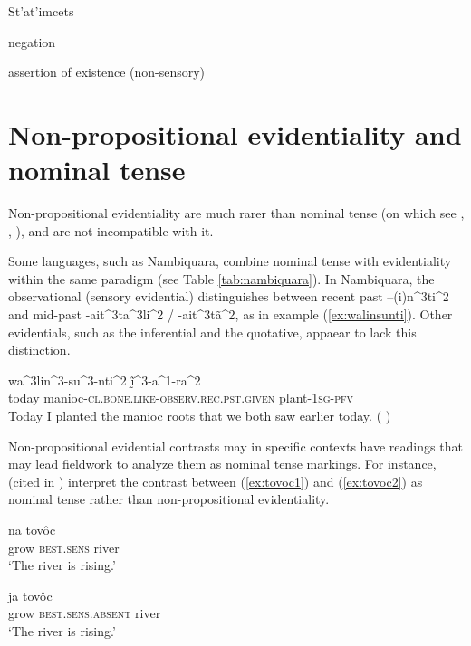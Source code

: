 \documentclass[oneside,a4paper,11pt]{article}
\newcommand{\ipa}[1]{{\phon \mbox{#1}}} %
\begin{document}
 

St'at'imcets

 negation
  
   \citet[193]{eijk97lillooet}
  \citet{gutierrez12determiners}
  
  assertion of existence (non-sensory)

\section{Non-propositional evidentiality and nominal tense}

Non-propositional evidentiality are much rarer than nominal tense (on which see \citealt{nordlinger04nominal}, \citealt{haude04tense}, \citealt[132]{francois05overview}), and are not incompatible with it.


Some languages, such as Nambiquara, combine nominal tense with evidentiality within the same paradigm (see Table \ref{tab:nambiquara}). In Nambiquara,  the observational (sensory evidential)  distinguishes between recent past \ipa{--(i)n^3ti^2} and mid-past \ipa{-ait^3ta^3li^2} /
\ipa{-ait^3tã^2}, as in example (\ref{ex:walinsunti}). Other evidentials, such as the inferential and the quotative, appaear to lack this distinction.

\begin{exe}
\ex \label{ex:walinsunti}
\gll  \ipa{hĩ^1na^2su^2} \ipa{wa^3lin^3-su^3-nti^2} \ipa{ḭ̃^3-a^1-ra^2} \\
today manioc-\textsc{cl.bone.like-observ.rec.pst.given} plant-\textsc{1sg-pfv} \\
\glt Today I planted the manioc roots that we both saw earlier today. (\citealt[290, ex 62.]{lowe99nambiquara} ) 
  \end{exe}

Non-propositional evidential contrasts may in specific contexts have readings that may lead fieldwork to analyze them as nominal tense markings. For instance, \citet[631]{campbell12chaco} (cited in \citealt{gutierrez14determiners}) interpret the contrast between (\ref{ex:tovoc1}) and (\ref{ex:tovoc2}) as nominal tense rather than non-propositional evidentiality.

\begin{exe}
\ex \label{ex:tovoc1}
\gll \ipa{tsej} \ipa{na} \ipa{tovôc} \\
  grow \textsc{best.sens} river \\
\glt `The river is rising.'
\end{exe}


\begin{exe}
\ex \label{ex:tovoc2}
\gll \ipa{tsej} \ipa{ja} \ipa{tovôc} \\
 grow \textsc{best.sens.absent} river \\
\glt `The river is rising.'
\end{exe}
\end{document}
